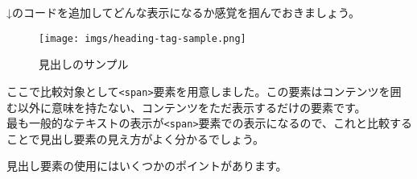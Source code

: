 ↓のコードを追加してどんな表示になるか感覚を掴んでおきましょう。

\begin{Shaded}
\begin{Highlighting}[]
\DataTypeTok{\textless{}}\DataTypeTok{\textgreater{}}\DataTypeTok{\textless{}/}\DataTypeTok{\textgreater{}}
\DataTypeTok{\textless{}}\DataTypeTok{\textgreater{}}\DataTypeTok{\textless{}/}\DataTypeTok{\textgreater{}}
\DataTypeTok{\textless{}}\DataTypeTok{\textgreater{}}\DataTypeTok{\textless{}/}\DataTypeTok{\textgreater{}}
\DataTypeTok{\textless{}}\DataTypeTok{\textgreater{}}\DataTypeTok{\textless{}/}\DataTypeTok{\textgreater{}}
\DataTypeTok{\textless{}}\DataTypeTok{\textgreater{}}\DataTypeTok{\textless{}/}\DataTypeTok{\textgreater{}}
\DataTypeTok{\textless{}}\DataTypeTok{\textgreater{}}\DataTypeTok{\textless{}/}\DataTypeTok{\textgreater{}}
\DataTypeTok{\textless{}}\DataTypeTok{\textgreater{}}\DataTypeTok{\textless{}/}\DataTypeTok{\textgreater{}}
\end{Highlighting}
\end{Shaded}

\begin{figure}
\centering
\texttt{[image: imgs/heading-tag-sample.png]}
\caption{見出しのサンプル}
\end{figure}

ここで比較対象として\texttt{\textless{}span\textgreater{}}要素を用意しました。この要素はコンテンツを囲む以外に意味を持たない、コンテンツをただ表示するだけの要素です。\\
最も一般的なテキストの表示が\texttt{\textless{}span\textgreater{}}要素での表示になるので、これと比較することで見出し要素の見え方がよく分かるでしょう。

見出し要素の使用にはいくつかのポイントがあります。

